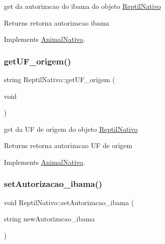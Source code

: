 get da autorizacao do ibama do objeto \mbox{\hyperlink{class_reptil_nativo}{Reptil\+Nativo}} 

\begin{DoxyReturn}{Returns}
retorna autorizacao ibama 
\end{DoxyReturn}


Implements \mbox{\hyperlink{class_animal_nativo}{Animal\+Nativo}}.

\mbox{\label{class_reptil_nativo_ae4c1f2cc1497acb75ddc639a952295b7}} 
\subsubsection{\texorpdfstring{getUF\_origem()}{getUF\_origem()}}
{\footnotesize\ttfamily string Reptil\+Nativo\+::get\+U\+F\+\_\+origem (\begin{DoxyParamCaption}\item[{void}]{ }\end{DoxyParamCaption})\hspace{0.3cm}{\ttfamily [virtual]}}



get da UF de origem do objeto \mbox{\hyperlink{class_reptil_nativo}{Reptil\+Nativo}} 

\begin{DoxyReturn}{Returns}
retorna autorizacao UF de origem 
\end{DoxyReturn}


Implements \mbox{\hyperlink{class_animal_nativo}{Animal\+Nativo}}.

\mbox{\label{class_reptil_nativo_a2d73a698f46933fd3825c3ec1bfee7fd}} 
\subsubsection{\texorpdfstring{setAutorizacao\_ibama()}{setAutorizacao\_ibama()}}
{\footnotesize\ttfamily void Reptil\+Nativo\+::set\+Autorizacao\+\_\+ibama (\begin{DoxyParamCaption}\item[{string}]{new\+Autorizacao\+\_\+ibama }\end{DoxyParamCaption})\hspace{0.3cm}{\ttfamily [virtual]}}



